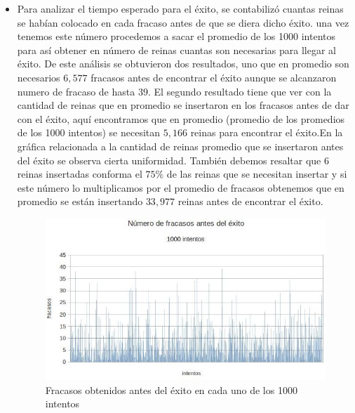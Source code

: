 \documentclass[a4paper,10pt]{article}
\begin{document}
\begin{itemize}
\item Para analizar el tiempo esperado para el éxito, se contabilizó cuantas reinas se habían colocado en cada fracaso antes de que se diera dicho éxito. una vez tenemos este número procedemos a sacar
el promedio de los 1000 intentos para así obtener en número de reinas cuantas son necesarias para llegar al éxito. De este análisis se obtuvieron dos resultados, uno que en promedio son necesarios $6,577$ 
fracasos antes de encontrar el éxito aunque se alcanzaron numero de fracaso de hasta $39$. El segundo resultado tiene que ver con la cantidad de reinas que en promedio se insertaron en los fracasos
antes de dar con el éxito, aquí encontramos que en promedio (promedio de los promedios de los 1000 intentos) se necesitan $5,166$ reinas para encontrar el éxito.En la gráfica relacionada a la cantidad de reinas
promedio que se insertaron antes del éxito se observa cierta uniformidad. También debemos resaltar que 6 reinas insertadas conforma el $75\%$ de las reinas que se necesitan insertar y si este número
lo multiplicamos por el promedio de fracasos obtenemos que en promedio se están insertando $33,977$ reinas antes de encontrar el éxito.

\begin{figure}
 \centering
 \includegraphics[scale=0.5]{fracasos.jpg}
 \caption{Fracasos obtenidos antes del éxito en cada uno de los 1000 intentos}
 \label{fig:fracasos}
\end{figure}



\end{itemize}
\end{document}
